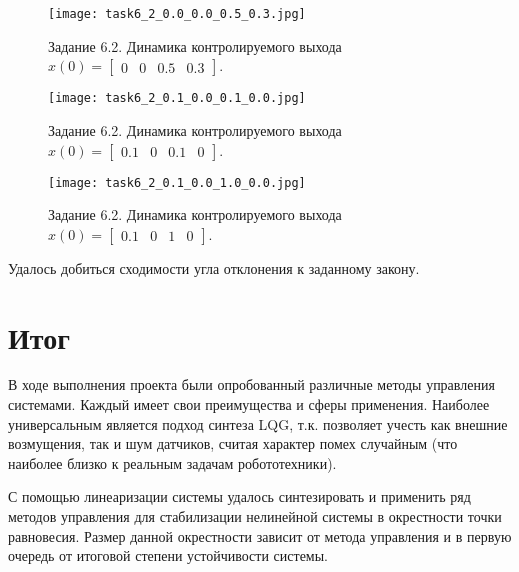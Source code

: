\begin{figure}[]
    \centering
    \texttt{[image: task6\_2\_0.0\_0.0\_0.5\_0.3.jpg]}
    \caption{Задание 6.2. Динамика контролируемого выхода $x(0) = \begin{bmatrix} 0 & 0 & 0.5 & 0.3 \end{bmatrix}$.}
    \label{fig:task6_2_1}
\end{figure}
\begin{figure}[]
    \centering
    \texttt{[image: task6\_2\_0.1\_0.0\_0.1\_0.0.jpg]}
    \caption{Задание 6.2. Динамика контролируемого выхода $x(0) = \begin{bmatrix} 0.1 & 0 & 0.1 & 0 \end{bmatrix}$.}
    \label{fig:task6_2_2}
\end{figure}
\begin{figure}[]
    \centering
    \texttt{[image: task6\_2\_0.1\_0.0\_1.0\_0.0.jpg]}
    \caption{Задание 6.2. Динамика контролируемого выхода $x(0) = \begin{bmatrix} 0.1 & 0 & 1 & 0 \end{bmatrix}$.}
    \label{fig:task6_2_3}
\end{figure}
Удалось добиться сходимости угла отклонения к заданному закону.

\pagebreak
\section{Итог}
В ходе выполнения проекта были опробованный различные методы управления системами. Каждый имеет свои преимущества и сферы применения. Наиболее универсальным является подход синтеза LQG, т.к. позволяет учесть как внешние возмущения, так и шум датчиков, считая характер помех случайным (что наиболее близко к реальным задачам робототехники).

С помощью линеаризации системы удалось синтезировать и применить ряд методов управления для стабилизации нелинейной системы в окрестности точки равновесия. Размер данной окрестности зависит от метода управления и в первую очередь от итоговой степени устойчивости системы.